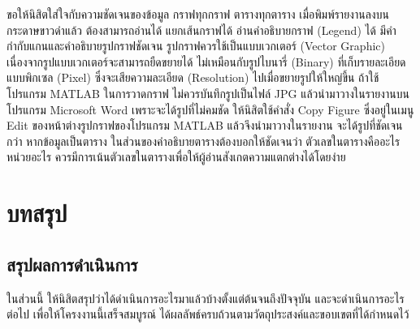 \documentclass[11pt,a4paper]{article}
\begin{document}
ขอให้นิสิตใส่ใจกับความชัดเจนของข้อมูล กราฟทุกกราฟ ตารางทุกตาราง เมื่อพิมพ์รายงานลงบนกระดาษขาวดำแล้ว ต้องสามารถอ่านได้ แยกเส้นกราฟได้ อ่านคำอธิบายกราฟ (Legend) ได้ มีคำกำกับแกนและคำอธิบายรูปกราฟชัดเจน รูปกราฟควรใช้เป็นแบบเวกเตอร์ (Vector Graphic) เนื่องจากรูปแบบเวกเตอร์จะสามารถยืดขยายได้ ไม่เหมือนกับรูปไบนารี่ (Binary) ที่เก็บรายละเอียดแบบพิกเซล (Pixel) ซึ่งจะเสียความละเอียด (Resolution) ไปเมื่อขยายรูปให้ใหญ่ขึ้น ถ้าใช้โปรแกรม MATLAB ในการวาดกราฟ ไม่ควรบันทึกรูปเป็นไฟล์ JPG แล้วนำมาวางในรายงานบนโปรแกรม Microsoft Word เพราะจะได้รูปที่ไม่คมชัด ให้นิสิตใช้คำสั่ง Copy Figure ซึ่งอยู่ในเมนู Edit ของหน้าต่างรูปกราฟของโปรแกรม MATLAB แล้วจึงนำมาวางในรายงาน จะได้รูปที่ชัดเจนกว่า หากข้อมูลเป็นตาราง ในส่วนของคำอธิบายตารางต้องบอกให้ชัดเจนว่า ตัวเลขในตารางคืออะไร หน่วยอะไร ควรมีการเน้นตัวเลขในตารางเพื่อให้ผู้อ่านสังเกตความแตกต่างได้โดยง่าย

\section{บทสรุป}
\subsection{สรุปผลการดำเนินการ}
ในส่วนนี้ ให้นิสิตสรุปว่าได้ดำเนินการอะไรมาแล้วบ้างตั้งแต่ต้นจนถึงปัจจุบัน และจะดำเนินการอะไรต่อไป เพื่อให้โครงงานนี้เสร็จสมบูรณ์ ได้ผลลัพธ์ครบถ้วนตามวัตถุประสงค์และขอบเขตที่ได้กำหนดไว้
\end{document}
